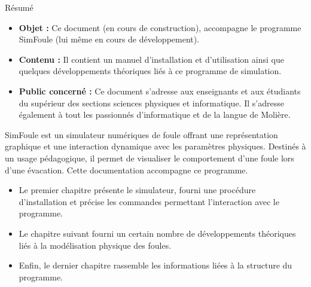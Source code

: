\begin{center}
\Large
Résumé
\normalsize
\end{center}
\vspace{3cm}
\begin{itemize}[leftmargin=1cm, label=, itemsep=21pt]
\item {\bf Objet : }Ce document (en cours de construction), accompagne le programme SimFoule (lui même en cours de développement).
\item {\bf Contenu : }Il contient un manuel d'installation et d'utilisation ainsi que quelques développements théoriques liés à ce programme de simulation.
\item {\bf Public concerné : }Ce document s'adresse aux enseignants et aux étudiants du supérieur des sections sciences physiques et informatique. Il s'adresse également à tout les passionnés d'informatique et de la langue de Molière.
\end{itemize}

\vspace{3cm}

SimFoule est un simulateur numériques de foule offrant une représentation graphique et une interaction dynamique avec les paramètres physiques. Destinés à un usage pédagogique, il permet de visualiser le comportement d'une foule lors d'une évacation. Cette documentation accompagne ce programme.

\begin{itemize}[leftmargin=1cm, label=, itemsep=11pt]
\item Le premier chapitre présente le simulateur, fourni une procédure d'installation et précise les commandes permettant l'interaction avec le programme.
\item Le chapitre suivant fourni un certain nombre de développements théoriques liés à la modélisation physique des foules.
\item Enfin, le dernier chapitre rassemble les informations liées à la structure du programme.
\end{itemize}
